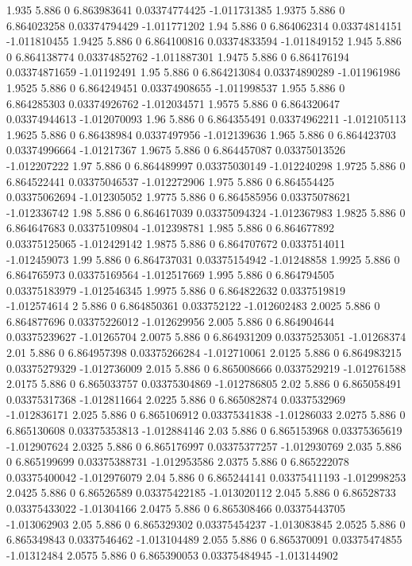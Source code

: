 {1.935 5.886 0 6.863983641 0.03374774425 -1.011731385
1.9375 5.886 0 6.864023258 0.03374794429 -1.011771202
1.94 5.886 0 6.864062314 0.03374814151 -1.011810455
1.9425 5.886 0 6.864100816 0.03374833594 -1.011849152
1.945 5.886 0 6.864138774 0.03374852762 -1.011887301
1.9475 5.886 0 6.864176194 0.03374871659 -1.01192491
1.95 5.886 0 6.864213084 0.03374890289 -1.011961986
1.9525 5.886 0 6.864249451 0.03374908655 -1.011998537
1.955 5.886 0 6.864285303 0.03374926762 -1.012034571
1.9575 5.886 0 6.864320647 0.03374944613 -1.012070093
1.96 5.886 0 6.864355491 0.03374962211 -1.012105113
1.9625 5.886 0 6.86438984 0.0337497956 -1.012139636
1.965 5.886 0 6.864423703 0.03374996664 -1.01217367
1.9675 5.886 0 6.864457087 0.03375013526 -1.012207222
1.97 5.886 0 6.864489997 0.03375030149 -1.012240298
1.9725 5.886 0 6.864522441 0.03375046537 -1.012272906
1.975 5.886 0 6.864554425 0.03375062694 -1.012305052
1.9775 5.886 0 6.864585956 0.03375078621 -1.012336742
1.98 5.886 0 6.864617039 0.03375094324 -1.012367983
1.9825 5.886 0 6.864647683 0.03375109804 -1.012398781
1.985 5.886 0 6.864677892 0.03375125065 -1.012429142
1.9875 5.886 0 6.864707672 0.0337514011 -1.012459073
1.99 5.886 0 6.864737031 0.03375154942 -1.01248858
1.9925 5.886 0 6.864765973 0.03375169564 -1.012517669
1.995 5.886 0 6.864794505 0.03375183979 -1.012546345
1.9975 5.886 0 6.864822632 0.0337519819 -1.012574614
2 5.886 0 6.864850361 0.033752122 -1.012602483
2.0025 5.886 0 6.864877696 0.03375226012 -1.012629956
2.005 5.886 0 6.864904644 0.03375239627 -1.01265704
2.0075 5.886 0 6.864931209 0.03375253051 -1.01268374
2.01 5.886 0 6.864957398 0.03375266284 -1.012710061
2.0125 5.886 0 6.864983215 0.03375279329 -1.012736009
2.015 5.886 0 6.865008666 0.0337529219 -1.012761588
2.0175 5.886 0 6.865033757 0.03375304869 -1.012786805
2.02 5.886 0 6.865058491 0.03375317368 -1.012811664
2.0225 5.886 0 6.865082874 0.0337532969 -1.012836171
2.025 5.886 0 6.865106912 0.03375341838 -1.01286033
2.0275 5.886 0 6.865130608 0.03375353813 -1.012884146
2.03 5.886 0 6.865153968 0.03375365619 -1.012907624
2.0325 5.886 0 6.865176997 0.03375377257 -1.012930769
2.035 5.886 0 6.865199699 0.03375388731 -1.012953586
2.0375 5.886 0 6.865222078 0.03375400042 -1.012976079
2.04 5.886 0 6.865244141 0.03375411193 -1.012998253
2.0425 5.886 0 6.86526589 0.03375422185 -1.013020112
2.045 5.886 0 6.86528733 0.03375433022 -1.01304166
2.0475 5.886 0 6.865308466 0.03375443705 -1.013062903
2.05 5.886 0 6.865329302 0.03375454237 -1.013083845
2.0525 5.886 0 6.865349843 0.0337546462 -1.013104489
2.055 5.886 0 6.865370091 0.03375474855 -1.01312484
2.0575 5.886 0 6.865390053 0.03375484945 -1.013144902
}
